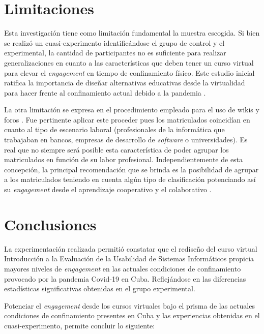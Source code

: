 \documentclass{textolivre}
\begin{document}
\section{Limitaciones}
Esta investigación tiene como limitación fundamental la muestra escogida. Si bien se realizó un cuasi-experimento identificándose el grupo de control y el experimental, la cantidad de participantes no es suficiente para realizar generalizaciones en cuanto a las características que deben tener un curso virtual para elevar el \emph{engagement} en tiempo de confinamiento físico. Este estudio inicial ratifica la importancia de diseñar alternativas educativas desde la virtualidad para hacer frente al confinamiento actual debido a la pandemia \cite{smith2021}. %

La otra limitación se expresa en el procedimiento empleado para el uso de wikis y foros . Fue pertinente aplicar este proceder pues los matriculados coincidían en cuanto al tipo de escenario laboral (profesionales de la informática que trabajaban en bancos, empresas de desarrollo de \emph{software} o universidades). Es real que no siempre será posible esta característica de poder agrupar los matriculados en función de su labor profesional. Independientemente de esta concepción, la principal recomendación que se brinda es la posibilidad de agrupar a los matriculados teniendo en cuenta algún tipo de clasificación potenciando así su \emph{engagement} desde el aprendizaje cooperativo y el colaborativo \cite{cardona2015, li2020}. %

\section{Conclusiones}
La experimentación realizada permitió constatar que el rediseño del curso virtual Introducción a la Evaluación de la Usabilidad de Sistemas Informáticos propicia mayores niveles de \emph{engagement} en las actuales condiciones de confinamiento provocado por la pandemia Covid-19 en Cuba. Reflejándose en las diferencias estadísticas significativas obtenidas en el grupo experimental.

Potenciar el \emph{engagement} desde los cursos virtuales bajo el prisma de las actuales condiciones de confinamiento presentes en Cuba y las experiencias obtenidas en el cuasi-experimento, permite concluir lo siguiente:
\end{document}

